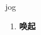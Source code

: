 
\begin{frame}
{\huge jog}
\begin{center}
\begin{enumerate}\Large
  \item \textbf{唤起}
\end{enumerate}
\end{center}
\end{frame}
